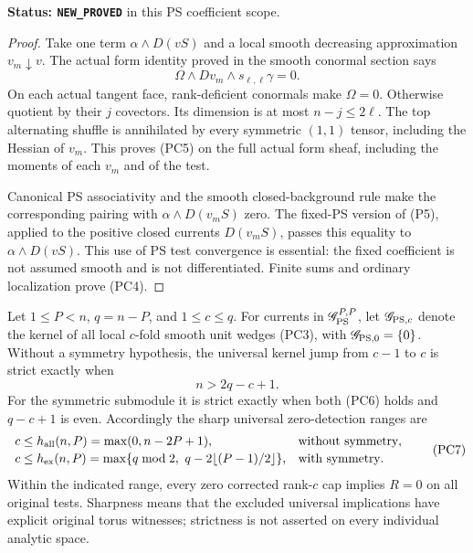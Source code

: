 \noindent\textbf{Status: \texttt{NEW\_PROVED}} in this
PS coefficient scope.

\begin{proof}
Take one term $\alpha\wedge D(vS)$ and a local smooth
decreasing approximation $v_m\downarrow v$.  The actual
form identity proved in the smooth conormal section says
\[
                    \Omega\wedge Dv_m\wedge
                                  s_{\ell,\ell}\gamma=0.
 \tag{PC5}
\]
On each actual tangent face, rank-deficient conormals
make $\Omega=0$.  Otherwise quotient by their $j$
covectors.  Its dimension is at most $n-j\le2\ell$.
The top alternating shuffle is annihilated by every
symmetric $(1,1)$ tensor, including the Hessian of $v_m$.
This proves (PC5) on the full actual form sheaf, including
the moments of each $v_m$ and of the test.

Canonical PS associativity and the smooth closed-background
rule make the corresponding pairing with
$\alpha\wedge D(v_mS)$ zero.  The fixed-PS version of
(P5), applied to the positive closed currents $D(v_mS)$,
passes this equality to $\alpha\wedge D(vS)$.
This use of PS test convergence is essential: the fixed
coefficient is not assumed smooth and is not differentiated.
Finite sums and ordinary localization prove (PC4).
\end{proof}

\begin{theorem}
\label{thm:r10-pws-generated-thresholds}
Let $1\le P<n$, $q=n-P$, and $1\le c\le q$.
For currents in $\mathscr G_{\rm PS}^{P,P}$, let
$\mathscr G_{{\rm PS},c}$ denote the kernel of all local
$c$-fold smooth unit wedges (PC3), with
$\mathscr G_{{\rm PS},0}=\{0\}$.
Without a symmetry hypothesis, the universal kernel jump
from $c-1$ to $c$ is strict exactly when
\[
                              n>2q-c+1.
 \tag{PC6}
\]
For the symmetric submodule it is strict exactly when
both (PC6) holds and $q-c+1$ is even.  Accordingly the
sharp universal zero-detection ranges are
\[
 \begin{array}{ll}
 c\le h_{\rm all}(n,P)=\max(0,n-2P+1),
                      &\text{without symmetry},\\[2pt]
 c\le h_{\rm ex}(n,P)
       =\max\{q\bmod2,\ q-2\lfloor(P-1)/2\rfloor\},
                      &\text{with symmetry}.
 \end{array}
 \tag{PC7}
\]
Within the indicated range, every zero corrected rank-$c$
cap implies $R=0$ on all original tests.  Sharpness means
that the excluded universal implications have explicit
original torus witnesses; strictness is not asserted on
every individual analytic space.
\end{theorem}

